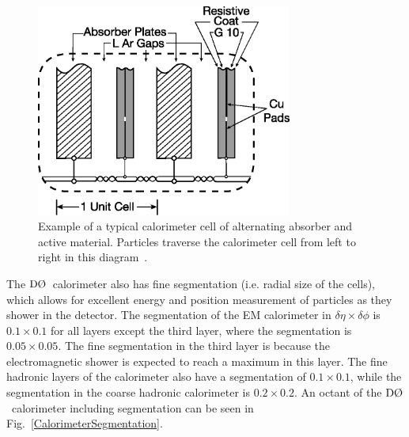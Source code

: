 \begin{figure}[!h!tbp]
\begin{center}
\includegraphics[width=0.75\textwidth]{eps/D0/CalorimeterCell.eps}
\end{center}
\vspace{-0.1in}
\caption{Example of a typical calorimeter cell of alternating absorber and active material. Particles traverse the calorimeter cell from left to right in this diagram~\cite{Abazov:2005pn}.}
\label{CalorimeterCell}
\end{figure}

The $\dzero$~calorimeter also has fine segmentation (i.e. radial size of the cells), which allows for excellent energy and position measurement of particles as they shower in the detector. The segmentation of the EM calorimeter in $\delta\eta \times \delta\phi$ is $0.1 \times 0.1$ for all layers except the third layer, where the segmentation is $0.05 \times 0.05$. The fine segmentation in the third layer 
is because the electromagnetic shower is expected to reach a maximum in this layer. The fine hadronic layers of the calorimeter also have a segmentation of $0.1 \times 0.1$, while the segmentation in the coarse hadronic calorimeter is $0.2 \times 0.2$. An octant of the $\dzero$~calorimeter including segmentation can be seen in Fig.~\ref{CalorimeterSegmentation}. 

